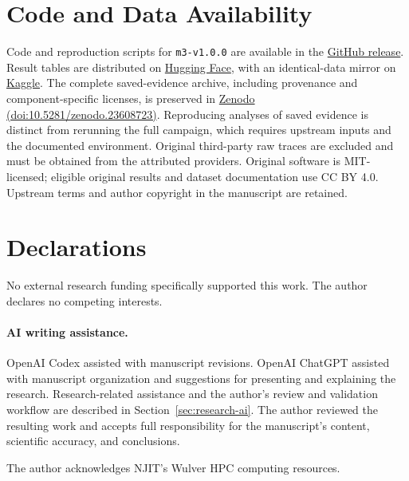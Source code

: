 \section*{Code and Data Availability}
Code and reproduction scripts for \texttt{m3-v1.0.0} are available in the
\href{https://github.com/SoroushVahidi/llm-serving-scheduler-robustness-benchmark/releases/tag/m3-v1.0.0}{GitHub release}.
Result tables are distributed on
\href{https://huggingface.co/datasets/SoroushVahidi/llm-serving-common-contract-m3}{Hugging Face},
with an identical-data mirror on
\href{https://www.kaggle.com/datasets/soroushvahidi/llm-serving-common-contract-m3}{Kaggle}.
The complete saved-evidence archive, including provenance and
component-specific licenses, is preserved in
\href{https://doi.org/10.5281/zenodo.23608723}{Zenodo (doi:10.5281/zenodo.23608723)}.
Reproducing analyses of saved evidence is distinct from rerunning the full
campaign, which requires upstream inputs and the documented environment.
Original third-party raw traces are excluded and must be obtained from
the attributed providers. Original software is MIT-licensed; eligible
original results and dataset documentation use CC BY 4.0. Upstream terms
and author copyright in the manuscript are retained.

\section*{Declarations}
No external research funding specifically supported this work. The author
declares no competing interests.

\paragraph{AI writing assistance.}
OpenAI Codex assisted with manuscript revisions. OpenAI ChatGPT assisted
with manuscript organization and suggestions for presenting and explaining
the research. Research-related assistance and the author's review and
validation workflow are described in Section~\ref{sec:research-ai}.
The author reviewed the resulting work and accepts full responsibility
for the manuscript's content, scientific accuracy, and conclusions.

\begin{acks}
The author acknowledges NJIT's Wulver HPC computing resources.
\end{acks}
